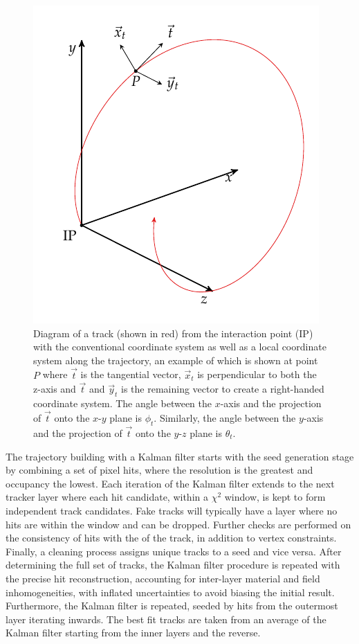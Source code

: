 \begin{figure}
    \centering
    \includegraphics{diagrams/tikz/kf_parameters/kf_parameters.pdf}
    \caption[Coordinate system to describe the curved path of a charged particle within an magnetic field.]{
        Diagram of a track (shown in red) from the interaction point (IP) with the conventional \CMS coordinate system as well as a local coordinate system along the trajectory, an example of which is shown at point $P$ where $\vec{t}$ is the tangential vector, $\vec{x}_{t}$ is perpendicular to both the z-axis and $\vec{t}$ and $\vec{y}_{t}$ is the remaining vector to create a right-handed coordinate system. The angle between the $x$-axis and the projection of ${\vec{t}}$ onto the $x$-$y$ plane is $\phi_t$. Similarly, the angle between the $y$-axis and the projection of ${\vec{t}}$ onto the $y$-$z$ plane is $\theta_t$.
    }
    \label{fig:kf_parameters}
\end{figure}

The trajectory building with a Kalman filter starts with the seed generation stage by combining a set of pixel hits, where the resolution is the greatest and occupancy the lowest. Each iteration of the Kalman filter extends to the next tracker layer where each hit candidate, within a $\chi^2$ window, is kept to form independent track candidates. Fake tracks will typically have a layer where no hits are within the window and can be dropped. Further checks are performed on the consistency of hits with the \pt of the track, in addition to vertex constraints. Finally, a cleaning process assigns unique tracks to a seed and vice versa. After determining the full set of tracks, the Kalman filter procedure is repeated with the precise hit reconstruction, accounting for inter-layer material and field inhomogeneities, with inflated uncertainties to avoid biasing the initial result. Furthermore, the Kalman filter is repeated, seeded by hits from the outermost layer iterating inwards.  The best fit tracks are taken from an average of the Kalman filter starting from the inner layers and the reverse.

